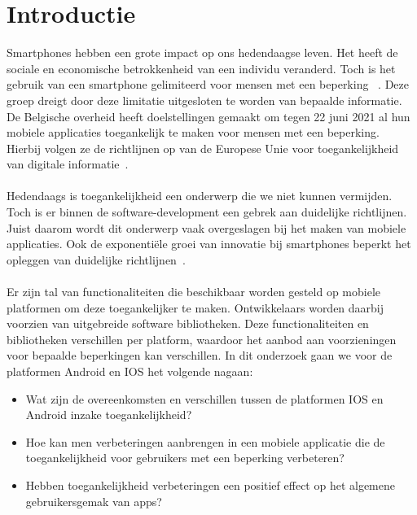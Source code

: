 
\section{Introductie} %
\label{sec:introductie}

Smartphones hebben een grote impact op ons hedendaagse leven. Het heeft de sociale en economische betrokkenheid van een individu veranderd.  Toch is het gebruik van een smartphone gelimiteerd voor mensen met een beperking
~\autocite{morris2014wireless}. Deze groep dreigt door deze limitatie uitgesloten te worden van bepaalde informatie. De Belgische overheid heeft doelstellingen gemaakt om tegen 22 juni 2021 al hun mobiele applicaties toegankelijk te maken voor mensen met een beperking. Hierbij volgen ze de richtlijnen op van de Europese Unie voor toegankelijkheid van digitale informatie~\autocite{Knacktoegankelijkheid2018}.
\\~\\
Hedendaags is toegankelijkheid een onderwerp die we niet kunnen vermijden. Toch is er binnen de software-development een gebrek aan duidelijke richtlijnen. Juist daarom wordt dit onderwerp vaak overgeslagen bij het maken van mobiele applicaties. Ook de exponentiële groei van innovatie bij smartphones beperkt het opleggen van duidelijke richtlijnen~\autocite{diaz2014accessibility}. \\~\\ Er zijn  tal van functionaliteiten die beschikbaar worden gesteld op mobiele platformen om deze toegankelijker te maken. Ontwikkelaars worden daarbij voorzien van uitgebreide software bibliotheken. Deze functionaliteiten en bibliotheken verschillen per platform, waardoor het aanbod aan voorzieningen voor bepaalde beperkingen kan verschillen. In dit onderzoek gaan we voor de platformen Android en IOS het volgende nagaan:




\begin{itemize}
    \setlength\itemsep{0.5 em}
    \item Wat zijn de overeenkomsten en verschillen tussen de platformen IOS en Android inzake toegankelijkheid?
  \item Hoe kan men verbeteringen aanbrengen in een mobiele applicatie die de toegankelijkheid voor gebruikers met een beperking verbeteren?
  \item Hebben toegankelijkheid verbeteringen een positief effect op het algemene gebruikersgemak van apps? 
  
\end{itemize}

